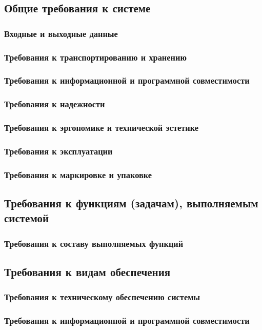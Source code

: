 \subsection{Общие требования к системе}
\subsubsection{Входные и выходные данные}


\subsubsection{Требования к транспортированию и хранению}


\subsubsection{Требования к информационной и программной совместимости}


\subsubsection{Требования к надежности}


\subsubsection{Требования к эргономике и технической эстетике}


\subsubsection{Требования к эксплуатации}


\subsubsection{Требования к маркировке и упаковке}


\subsection{Требования к функциям (задачам), выполняемым системой}
\subsubsection{Требования к составу выполняемых функций}


\subsection{Требования к видам обеспечения}
\subsubsection{Требования к техническому обеспечению системы}


\subsubsection{Требования к информационной и программной совместимости}


